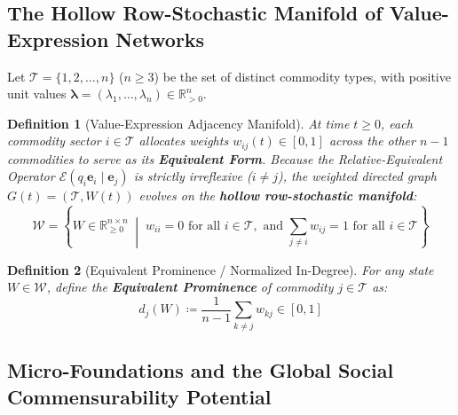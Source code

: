 \documentclass[11pt,a4paper]{article}
\newtheorem{definition}{Definition}[section]
\begin{document}
\subsection{The Hollow Row-Stochastic Manifold of Value-Expression Networks}

Let $\mathcal{T} = \{1, 2, \dots, n\}$ ($n \ge 3$) be the set of distinct commodity types, with positive unit values $\boldsymbol{\lambda} = (\lambda_1, \dots, \lambda_n) \in \mathbb{R}^n_{>0}$.

\begin{definition}[Value-Expression Adjacency Manifold]
At time $t \ge 0$, each commodity sector $i \in \mathcal{T}$ allocates weights $w_{ij}(t) \in [0, 1]$ across the other $n-1$ commodities to serve as its \textbf{Equivalent Form}. Because the Relative-Equivalent Operator $\mathcal{E}(q_i \mathbf{e}_i \mid \mathbf{e}_j)$ is strictly irreflexive ($i \neq j$), the weighted directed graph $G(t) = (\mathcal{T}, W(t))$ evolves on the \textbf{hollow row-stochastic manifold}:
\begin{equation}
    \mathcal{W} = \left\{ W \in \mathbb{R}^{n \times n}_{\ge 0} \;\middle|\; w_{ii} = 0 \text{ for all } i \in \mathcal{T}, \text{ and } \sum_{j \neq i} w_{ij} = 1 \text{ for all } i \in \mathcal{T} \right\}
\end{equation}
\end{definition}

\begin{definition}[Equivalent Prominence / Normalized In-Degree]
For any state $W \in \mathcal{W}$, define the \textbf{Equivalent Prominence} of commodity $j \in \mathcal{T}$ as:
\begin{equation}
    d_j(W) \coloneqq \frac{1}{n-1} \sum_{k \neq j} w_{kj} \in [0, 1]
\end{equation}
\end{definition}

\subsection{Micro-Foundations and the Global Social Commensurability Potential}
\end{document}

